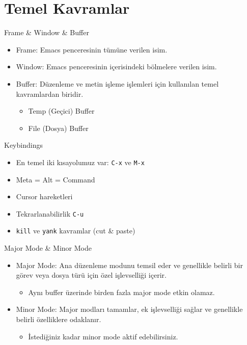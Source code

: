 \documentclass[presentation,smaller]{beamer}
\begin{document}
\section{Temel Kavramlar}
\label{sec:org1c3fa60}
\begin{frame}[label={sec:org999c917}]{Frame \& Window \& Buffer}
\begin{itemize}
\item \alert{Frame}: Emacs penceresinin tümüne verilen isim.
\item \alert{Window}: Emacs penceresinin içerisindeki bölmelere verilen isim.
\item \alert{Buffer}: Düzenleme ve metin işleme işlemleri için kullanılan temel kavramlardan biridir.
\begin{itemize}
\item Temp (Geçici) Buffer
\item File (Dosya) Buffer
\end{itemize}
\end{itemize}
\end{frame}
\begin{frame}[label={sec:orgb5b1869},fragile]{Keybindings}
 \begin{itemize}
\item En temel iki kısayolumuz var: \texttt{C-x} ve \texttt{M-x}
\item Meta = Alt = Command
\item Cursor hareketleri
\item Tekrarlanabilirlik \texttt{C-u}
\item \texttt{kill} ve \texttt{yank} kavramlar (cut \& paste)
\end{itemize}
\end{frame}
\begin{frame}[label={sec:orgee5d1bd}]{Major Mode \& Minor Mode}
\begin{itemize}
\item \alert{Major Mode}: Ana düzenleme modunu temsil eder ve genellikle belirli bir görev
veya dosya türü için özel işlevselliği içerir.
\begin{itemize}
\item Aynı buffer üzerinde birden fazla major mode etkin olamaz.
\end{itemize}
\item \alert{Minor Mode}: Major modları tamamlar, ek işlevselliği sağlar ve genellikle
belirli özelliklere odaklanır.
\begin{itemize}
\item İstediğiniz kadar minor mode aktif edebilirsiniz.
\end{itemize}
\end{itemize}
\end{frame}
\end{document}
